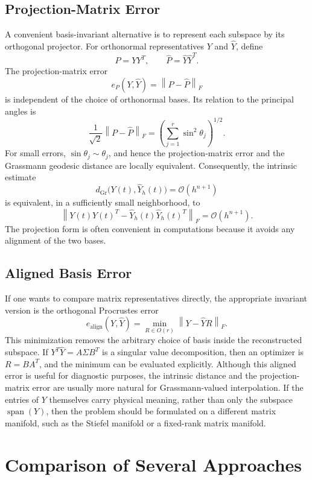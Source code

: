 \documentclass[a4paper,11pt]{article}
\DeclareMathOperator{\Gr}{Gr}
\DeclareMathOperator{\spanop}{span}
\newcommand{\norm}[1]{\left\lVert #1 \right\rVert}
\numberwithin{equation}{section}
\theoremstyle{plain}
\theoremstyle{definition}
\theoremstyle{remark}
\begin{document}
\subsection{Projection-Matrix Error}

A convenient basis-invariant alternative is to represent each subspace by its orthogonal projector.  For orthonormal representatives \(Y\) and \(\widehat Y\), define
\[
    P=YY^T,
    \qquad
    \widehat P=\widehat Y\widehat Y^T.
\]
The projection-matrix error
\[
    e_P(Y,\widehat Y)
    =
    \norm{P-\widehat P}_F
\]
is independent of the choice of orthonormal bases.  Its relation to the principal angles is
\[
    \frac{1}{\sqrt{2}}\norm{P-\widehat P}_F
    =
    \left(\sum_{j=1}^r\sin^2\theta_j\right)^{1/2}.
\]
For small errors, \(\sin\theta_j\sim\theta_j\), and hence the projection-matrix error and the Grassmann geodesic distance are locally equivalent.  Consequently, the intrinsic estimate
\[
    d_{\Gr}\bigl(Y(t),\widehat Y_h(t)\bigr)
    =
    \mathcal{O}(h^{n+1})
\]
is equivalent, in a sufficiently small neighborhood, to
\[
    \norm{
        Y(t)Y(t)^T
        -
        \widehat Y_h(t)\widehat Y_h(t)^T
    }_F
    =
    \mathcal{O}(h^{n+1}).
\]
The projection form is often convenient in computations because it avoids any alignment of the two bases.

\subsection{Aligned Basis Error}

If one wants to compare matrix representatives directly, the appropriate invariant version is the orthogonal Procrustes error
\[
    e_{\mathrm{align}}(Y,\widehat Y)
    =
    \min_{R\in O(r)}
    \norm{Y-\widehat YR}_F.
\]
This minimization removes the arbitrary choice of basis inside the reconstructed subspace.  If \(Y^T\widehat Y=A\Sigma B^T\) is a singular value decomposition, then an optimizer is \(R=BA^T\), and the minimum can be evaluated explicitly.  Although this aligned error is useful for diagnostic purposes, the intrinsic distance and the projection-matrix error are usually more natural for Grassmann-valued interpolation.  If the entries of \(Y\) themselves carry physical meaning, rather than only the subspace \(\spanop(Y)\), then the problem should be formulated on a different matrix manifold, such as the Stiefel manifold or a fixed-rank matrix manifold.


\section{Comparison of Several Approaches}
\label{sec:comparison_three_methods}
\end{document}
